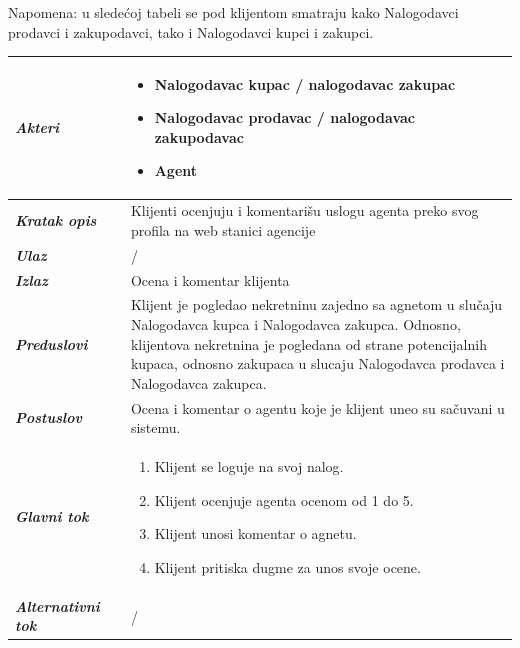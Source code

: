 \documentclass[20pt]{article}
\begin{document}
Napomena: u slede\' coj tabeli se pod klijentom smatraju kako Nalogodavci prodavci i zakupodavci, tako i Nalogodavci kupci i zakupci.
\begin{center}
\begin{longtable}{p{0.23\linewidth} p{0.77\linewidth}}
 \hline
 {\it \bfseries Akteri} & \begin{itemize}
    \item Nalogodavac kupac / nalogodavac zakupac
    \item Nalogodavac prodavac / nalogodavac zakupodavac
    \item Agent
\end{itemize}\\
\hline

 {\it \bfseries Kratak opis} & Klijenti ocenjuju i komentari\v{s}u uslogu agenta preko svog profila na web stanici agencije\\ 
 \hline
 
 {\it \bfseries Ulaz} & /\\ 
 \hline
 
 {\it \bfseries Izlaz} & Ocena i komentar klijenta\\
 \hline
 
 {\it \bfseries Preduslovi} & Klijent je pogledao nekretninu zajedno sa agnetom u slu\v caju Nalogodavca kupca i Nalogodavca zakupca. Odnosno, klijentova nekretnina je pogledana od strane potencijalnih kupaca, odnosno zakupaca u slucaju Nalogodavca prodavca i Nalogodavca zakupca.\\
 \hline

 {\it \bfseries Postuslov} & Ocena i komentar o agentu koje je klijent uneo su sa\v cuvani u sistemu.\\
 \hline

     {\it \bfseries Glavni tok} &  
     \begin{enumerate}
         \item  Klijent se loguje na svoj nalog.
         \item  Klijent ocenjuje agenta ocenom od 1 do 5.
         \item  Klijent unosi komentar o agnetu.
         \item  Klijent pritiska dugme za unos svoje ocene.
    \end{enumerate}\\
 \hline

 {\it \bfseries Alternativni tok} & /\\
 \hline
\end{longtable}
\end{center}
\end{document}
